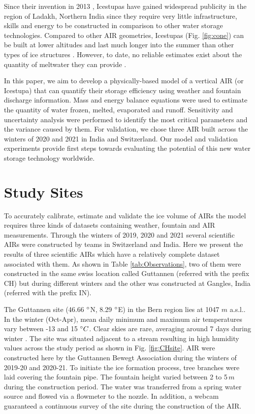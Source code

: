 \documentclass[utf8]{frontiersSCNS} %
\begin{document}
Since their invention in 2013 \citep{campaign}, Icestupas have gained widespread publicity in the region of Ladakh,
Northern India since they require very little infrastructure, skills and energy to be constructed in comparison to other
water storage technologies. Compared to other AIR geometries, Icestupas (Fig. \ref{fig:cone}) can be built at lower
altitudes and last much longer into the summer than other types of ice structures \citep{campaign}. However, to date, no
reliable estimates exist about the quantity of meltwater they can provide \citep{Nusser_2018}.

In this paper, we aim to develop a physically-based model of a vertical AIR (or Icestupa) that can quantify their
storage efficiency using weather and fountain discharge information. Mass and energy balance equations were used to
estimate the quantity of water frozen, melted, evaporated and runoff. Sensitivity and uncertainty analysis were
performed to identify the most critical parameters and the variance caused by them. For validation, we chose three AIR
built across the winters of 2020 and 2021 in India and Switzerland. Our model and validation experiments provide first
steps towards evaluating the potential of this new water storage technology worldwide.

\section{Study Sites}
To accurately calibrate, estimate and validate the ice volume of AIRs the model requires three kinds of datasets
containing weather, fountain and AIR measurements. Through the winters of 2019, 2020 and 2021 several scientific AIRs
were constructed by teams in Switzerland and India. Here we present the results of three scientific AIRs which have a
relatively complete dataset associated with them. As shown in Table \ref{tab:Observations}, two of them were
constructed in the same swiss location called Guttannen (referred with the prefix CH) but during different winters and
the other was constructed at Gangles, India (referred with the prefix IN).

The Guttannen site (46.66 $\degree$N, 8.29 $\degree$E) in the Bern region lies at 1047 $m$ a.s.l.. In the winter (Oct-Apr), mean
daily minimum and maximum air temperatures vary between -13 and 15 $\degree C$. Clear skies are rare, averaging around 7
days during winter \citep{eispalast}. The site was situated adjacent to a stream resulting in high humidity values
across the study period as shown in Fig. \ref{fig:CHsite}. AIR were constructed here by the Guttannen Bewegt Association
during the winters of 2019-20 and 2020-21. To initiate the ice formation process, tree branches were laid covering the
fountain pipe.  The fountain height varied between 2 to 5\,$m$ during the construction period. The water was transferred
from a spring water source and flowed via a flowmeter to the nozzle. In addition, a webcam guaranteed a continuous
survey of the site during the construction of the AIR.
\end{document}
